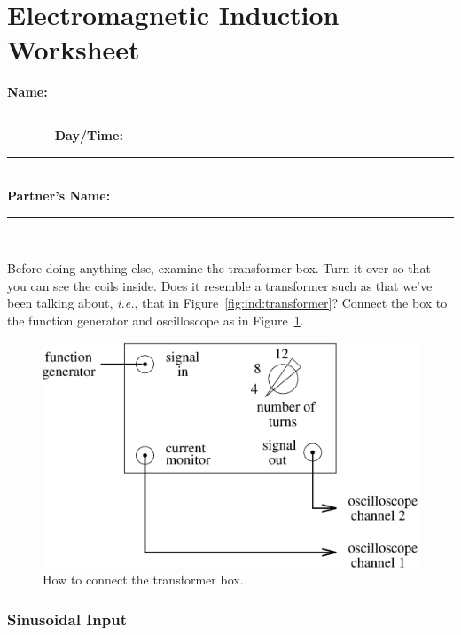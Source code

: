 \clearpage

\renewcommand{\thesection}{\thechapter.W}

\section{Electromagnetic Induction Worksheet}

{\bf \Large Name:}~ \rule{5cm}{.1mm}~~~~~~~
{\bf \Large Day/Time:}~\rule{3cm}{.1mm}\\
{\bf \Large Partner's Name:}~\rule{6cm}{.1mm}\\
\label{sec:ind:proc}

Before doing anything else, examine the transformer box.  Turn it over so that
you can see the coils inside.  Does it resemble a transformer such as that 
we've been talking about, {\it i.e.}, that in 
Figure~\ref{fig:ind:transformer}?  Connect the box to the function generator
and oscilloscope as in Figure~\ref{fig:ind:connect}.
\begin{figure}[htb]
\centering 
\epsfxsize=12cm \includegraphics[scale=0.6]{6_induction/connect.eps}
\caption{How to connect the transformer box.}
\label{fig:ind:connect}
\end{figure}

\subsubsection{Sinusoidal Input}

